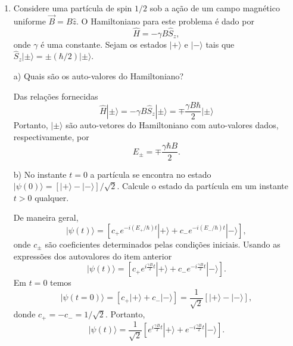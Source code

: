 \begin{enumerate}[start=1,label={\bfseries Q\arabic*.}]
\item Considere uma partícula de spin $1/2$ sob a ação de um campo magnético uniforme $\vec{B} = B\hat{z}$. O Hamiltoniano para este problema é dado por
$$
\hat{H} = - \gamma B \hat{S}_{z},
$$
onde $\gamma$ é uma constante. Sejam os estados $|+\rangle$ e $|-\rangle$ tais que $\hat{S}_{z} | \pm \rangle = \pm (\hbar/2) | \pm \rangle $.



a) Quais são os auto-valores do Hamiltoniano?

\resposta Das relações fornecidas
%
\begin{equation}
  \hat{H} | \pm \rangle = - \gamma B \hat{S}_{z} | \pm \rangle = \mp \frac{\gamma B \hbar}{2} | \pm \rangle
\end{equation}
%
Portanto, $| \pm \rangle$ são auto-vetores do Hamiltoniano com auto-valores dados, respectivamente, por
%
\begin{equation}
  E_{\pm} = \mp \frac{\gamma \hbar B}{2} .
\end{equation}
%




b) No instante $t = 0$ a partícula se encontra no estado $|\psi (0)\rangle = \left[ |+\rangle - |-\rangle \right] / \sqrt{2}$. Calcule o estado da partícula em um instante $t > 0$ qualquer.

\resposta De maneira geral,
%
\begin{equation}
| \psi(t) \rangle = \left[ c_{+} e^{-i(E_{+}/\hbar)t} | + \rangle + c_{-} e^{-i(E_{-}/\hbar)t} | - \rangle  \right] ,
\end{equation}
%
onde $c_{\pm}$ são coeficientes determinados pelas condições iniciais. Usando as expressões dos autovalores do item anterior
%
\begin{equation}
  | \psi (t) \rangle = \left[ c_{+} e^{i \frac{\gamma B}{2} t} | + \rangle + c_{-} e^{-i \frac{\gamma B}{2} t} | - \rangle  \right] .
\end{equation}
%
Em $t = 0$ temos
%
\begin{equation}
  | \psi (t=0) \rangle = [c_{+}|+\rangle + c_{-}|-\rangle] = \frac{1}{\sqrt{2}} [|+\rangle - |-\rangle] ,
\end{equation}
%
donde $c_{+} = - c_{-} =1/\sqrt{2}$. Portanto,
%
\begin{equation}
  | \psi (t) \rangle = \frac{1}{\sqrt{2}} \left[ e^{i \frac{\gamma B}{2} t} | + \rangle + e^{-i \frac{\gamma B}{2} t} | - \rangle  \right] .
\end{equation}
%



\end{enumerate}

